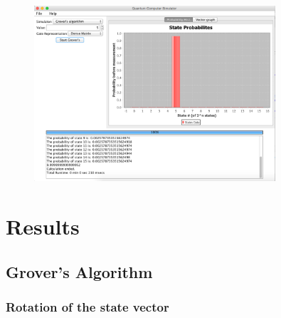 \documentclass[bibliography=totocnumbered, 10pt]{article}
\theoremstyle{NoticeStyle}
\begin{document}
\begin{figure}[H]
\centering
\includegraphics[width=0.8\textwidth]{img/program_example.pdf}
\caption{}
\end{figure}

%
\section{Results}\label{sec:Results}

\subsection{Grover's Algorithm}\label{sec:Grover}
\subsubsection{Rotation of the state vector}
\end{document}
